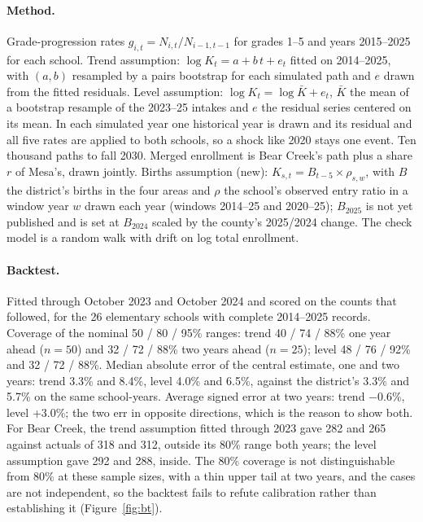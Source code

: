 \documentclass[11pt]{article}
\begin{document}
\paragraph{Method.} Grade-progression rates $g_{i,t} = N_{i,t}/N_{i-1,t-1}$ for grades 1--5 and years 2015--2025 for each school. Trend assumption: $\log K_t = a + b\,t + e_t$ fitted on 2014--2025, with $(a,b)$ resampled by a pairs bootstrap for each simulated path and $e$ drawn from the fitted residuals. Level assumption: $\log K_t = \log \bar K + e_t$, $\bar K$ the mean of a bootstrap resample of the 2023--25 intakes and $e$ the residual series centered on its mean. In each simulated year one historical year is drawn and its residual and all five rates are applied to both schools, so a shock like 2020 stays one event. Ten thousand paths to fall 2030. Merged enrollment is Bear Creek's path plus a share $r$ of Mesa's, drawn jointly. Births assumption (new): $K_{s,t} = B_{t-5} \times \rho_{s,w}$, with $B$ the district's births in the four areas and $\rho$ the school's observed entry ratio in a window year $w$ drawn each year (windows 2014--25 and 2020--25); $B_{2025}$ is not yet published and is set at $B_{2024}$ scaled by the county's 2025/2024 change. The check model is a random walk with drift on log total enrollment.

\paragraph{Backtest.} Fitted through October 2023 and October 2024 and scored on the counts that followed, for the 26 elementary schools with complete 2014--2025 records. Coverage of the nominal 50 / 80 / 95\% ranges: trend 40 / 74 / 88\% one year ahead ($n=50$) and 32 / 72 / 88\% two years ahead ($n=25$); level 48 / 76 / 92\% and 32 / 72 / 88\%. Median absolute error of the central estimate, one and two years: trend 3.3\% and 8.4\%, level 4.0\% and 6.5\%, against the district's 3.3\% and 5.7\% on the same school-years. Average signed error at two years: trend $-$0.6\%, level +3.0\%; the two err in opposite directions, which is the reason to show both. For Bear Creek, the trend assumption fitted through 2023 gave 282 and 265 against actuals of 318 and 312, outside its 80\% range both years; the level assumption gave 292 and 288, inside. The 80\% coverage is not distinguishable from 80\% at these sample sizes, with a thin upper tail at two years, and the cases are not independent, so the backtest fails to refute calibration rather than establishing it (Figure~\ref{fig:bt}).
\end{document}
